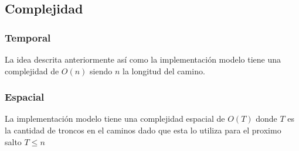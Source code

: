\documentclass{article}
\begin{document}
\subsection{Complejidad}
\subsubsection{Temporal}
La idea descrita anteriormente así como la implementación modelo tiene una 
complejidad de $O(n)$ siendo $n$ la longitud del camino.
\subsubsection{Espacial}
La implementación modelo tiene una complejidad espacial de 
$O(T)$ donde $T$ es la cantidad de troncos en el caminos
dado que esta lo utiliza para el proximo salto
$T \leq n$
\end{document}
